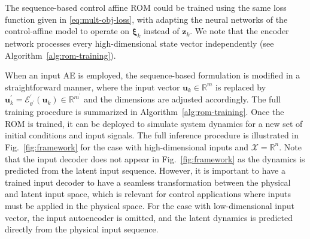 \documentclass{article}
\begin{document}
The sequence-based control affine ROM could be trained using the same loss function given in \eqref{eq:mult-obj-loss}, with adapting the neural networks of the control-affine model to operate on $\boldsymbol{\xi}_k$ instead of $\mathbf{z}_k$. 
We note that the encoder network processes every high-dimensional state vector independently (see Algorithm~\ref{alg:rom-training}).

When an input AE is employed, the sequence-based formulation is modified in a straightforward manner, where the input vector $\mathbf{u}_k \in \mathbb{R}^{m}$ is replaced by $\mathbf{u}^\prime_k=\mathcal{E}^\prime_{\theta^\prime}(\mathbf{u}_k) \in \mathbb{R}^{m^\prime}$ and the dimensions are adjusted accordingly.
The full training procedure is summarized in Algorithm~\ref{alg:rom-training}.
Once the ROM is trained, it can be deployed to simulate system dynamics for a new set of initial conditions and input signals.
The full inference procedure is illustrated in Fig.~\ref{fig:framework} for the case with high-dimensional inputs and $\mathcal{X}=\mathbb{R}^n$. 
Note that the input decoder does not appear in Fig.~\ref{fig:framework} as the dynamics is predicted from the latent input sequence.
However, it is important to have a trained input decoder to have a seamless transformation between the physical and latent input space, which is relevant for control applications where inputs must be applied in the physical space.
For the case with low-dimensional input vector, the input autoencoder is omitted, and the latent dynamics is predicted directly from the physical input sequence.
\end{document}
